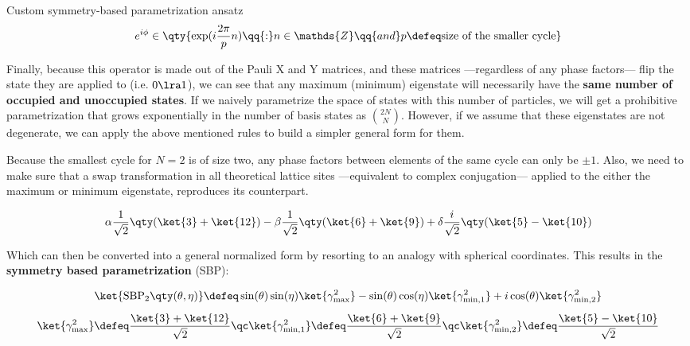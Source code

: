 \begin{frame}[allowframebreaks]{Custom symmetry-based parametrization ansatz}
	\begin{gather*}
	  e^{i\phi} \in
	    \qty{ \exp(i \frac{2\pi}{p} n) \qq{:} n \in \mathds{Z} \qq{and}
	    p \defeq \text{size of the smaller cycle} }
	\end{gather*}

	Finally, because this operator is made out of the Pauli X and Y matrices, and these matrices ---regardless of any phase factors--- flip the state they are applied to (i.e. $0 \lra 1$), we can see that any maximum (minimum) eigenstate will necessarily have the \textbf{same number of occupied and unoccupied states}. If we naively parametrize the space of states with this number of particles, we will get a prohibitive parametrization that grows exponentially in the number of basis states as $\binom{2N}{N}$. However, if we assume that these eigenstates are not degenerate, we can apply the above mentioned rules to build a simpler general form for them.

\break

	Because the smallest cycle for $N=2$ is of size two, any phase factors between elements of the same cycle can only be $\pm 1$. Also, we need to make sure that a swap transformation in all theoretical lattice sites ---equivalent to complex conjugation--- applied to the either the maximum or minimum eigenstate, reproduces its counterpart.

	\begin{gather*}
	  \alpha \frac{1}{\sqrt{2}} \qty(\ket{3}+\ket{12}) -
	  \beta \frac{1}{\sqrt{2}} \qty(\ket{6}+\ket{9})  +
	  \delta \frac{i}{\sqrt{2}} \qty(\ket{5} - \ket{10})
	\end{gather*}

	Which can then be converted into a general normalized form by resorting to an analogy with spherical coordinates. This results in the \textbf{symmetry based parametrization} (SBP):

	\begin{gather*}
	  \ket{\text{SBP}_{2} \qty(\theta, \eta)} \defeq
	    \sin(\theta)\sin(\eta) \ket{\gamma_{\text{max}}^2} -
	    \sin(\theta)\cos(\eta) \ket{\gamma_{\text{min},1}^2} + i
	    \cos(\theta) \ket{\gamma_{\text{min},2}^2} \\[5pt]
	  \ket{\gamma_{\text{max}}^2} \defeq
	    \frac{\ket{3}+\ket{12}}{\sqrt{2}} \qc
	  \ket{\gamma_{\text{min},1}^2} \defeq
	    \frac{\ket{6}+\ket{9}}{\sqrt{2}} \qc
	  \ket{\gamma_{\text{min},2}^2} \defeq
	    \frac{\ket{5} - \ket{10}}{\sqrt{2}}
	\end{gather*}


\end{frame}
